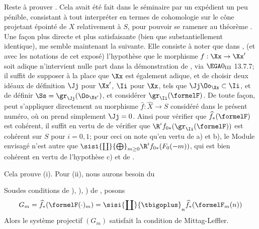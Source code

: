 Reste \`a prouver . Cela avait \'et\'e fait dans le
s\'eminaire par un exp\'edient un peu p\'enible, consistant \`a tout
interpr\'eter en termes de cohomologie sur le c\^{o}ne projetant
\'epoint\'e de $X$ relativement \`a $S$, pour pouvoir se ramener au
th\'eor\`eme . Une fa\c con plus directe et plus
satisfaisante (bien que substantiellement identique), me semble
maintenant la suivante. Elle consiste \`a noter que dans ,
\numero {}\label{XII.14} (et avec les
notations de cet expos\'e) l'hypoth\`ese que le morphisme
$f:\Xx\to\Xx'$ soit adique n'intervient nulle part dans la
d\'emonstration de , via $\EGA 0_{\textup{III}}$ 13.7.7;
il suffit de supposer \`a la place que $\Xx$ est \'egalement adique,
et de choisir deux id\'eaux de d\'efinition $\Jj$ pour $\Xx'$, $\Ii$
pour $\Xx$, tels que $\Jj\Oo_\Xx\subset\Ii$, et de d\'efinir
$\Ss=\gr_\Jj(\Oo_{\Xx'})$, et consid\'erer $\gr_\Ii(\formelF)$. De
toute fa\c con,  peut s'appliquer directement au
morphisme $\widehat{f}:\widehat{X}\to S$ consid\'er\'e dans le pr\'esent
num\'ero, o\`u on prend simplement $\Jj=0$. Ainsi pour v\'erifier que
$\widehat{f}_\ast(\formelF)$ est coh\'erent, il suffit en vertu de
\loccit de v\'erifier que $\R^if_{0\ast}(\gr_\Ii(\formelF))$ est
coh\'erent sur $S$ pour $i=0, 1$; pour ceci on note qu'en vertu de
a) et b), le Module envisag\'e n'est autre que
$\sisi{\coprod}{\bigoplus}_{m\geq 0}\R^if_{0\ast}(F_0(-m))$, qui
est bien coh\'erent en vertu de l'hypoth\`ese c) et de
.

Cela prouve  (i). Pour  (ii), nous aurons besoin du

\begin{lemme} \label{XII.3.3}
Sous\pageoriginaled les conditions de ), ), ) de , posons
\[
G_m= \widehat{f}_\ast(\formelF(\cdot)_m) = \sisi{\coprod}{\tbigoplus}_n\widehat{f}_\ast(\formelF_m(n))
\]
Alors le syst\`eme projectif $(G_m)$ satisfait la condition de Mittag-Leffler.
\end{lemme}

